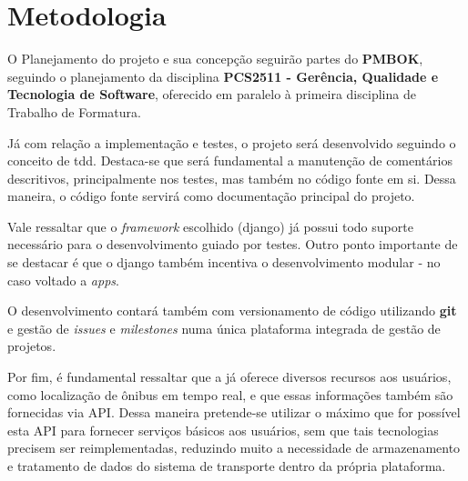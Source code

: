 \chapter{Metodologia}\label{chp: metodologia}

O Planejamento do projeto e sua concepção seguirão partes do \textbf{PMBOK}, seguindo o planejamento da disciplina \textbf{PCS2511 - Gerência, Qualidade e Tecnologia de Software}, oferecido em paralelo à primeira disciplina de Trabalho de Formatura.

Já com relação a implementação e testes, o projeto será desenvolvido seguindo o conceito de \gls{tdd}. Destaca-se que será fundamental a manutenção de comentários descritivos, principalmente nos testes, mas também no código fonte em si. Dessa maneira, o código fonte servirá como documentação principal do projeto.

Vale ressaltar que o \textit{framework} escolhido (\gls{django}) já possui todo suporte necessário para o desenvolvimento guiado por testes. Outro ponto importante de se destacar é que o \gls{django} também incentiva o desenvolvimento modular - no caso voltado a \textit{apps}.

O desenvolvimento contará também com versionamento de código utilizando \textbf{git} e gestão de \textit{issues} e \textit{milestones} numa única plataforma integrada de gestão de projetos.

Por fim, é fundamental ressaltar que a \sptrans já oferece diversos recursos aos usuários, como localização de ônibus em tempo real, e que essas informações também são fornecidas via API. Dessa maneira pretende-se utilizar o máximo que for possível esta API para fornecer serviços básicos aos usuários, sem que tais tecnologias precisem ser reimplementadas, reduzindo muito a necessidade de armazenamento e tratamento de dados do sistema de transporte dentro da própria plataforma.